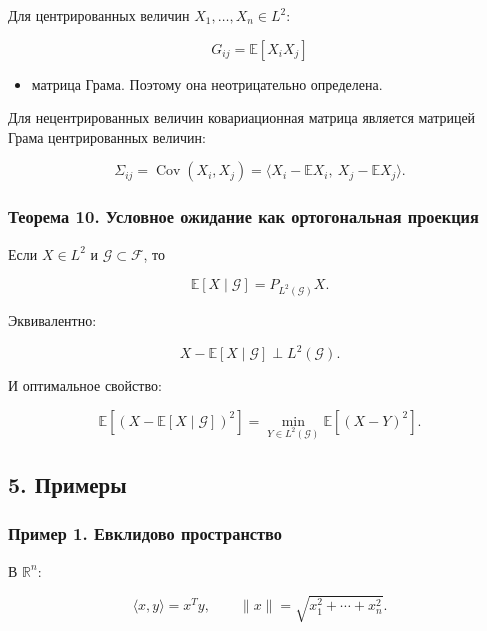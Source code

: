 \documentclass[
  11pt,
  a4paper,
]{article}
\providecommand{\tightlist}{%
  \setlength{\itemsep}{0pt}\setlength{\parskip}{0pt}}
\begin{document}
Для центрированных величин \(X_1,\ldots,X_n\in L^2\):

\[
G_{ij}=\mathbb E[X_iX_j]
\]

\begin{itemize}
\tightlist
\item
  матрица Грама. Поэтому она неотрицательно определена.
\end{itemize}

Для нецентрированных величин ковариационная матрица является матрицей
Грама центрированных величин:

\[
\Sigma_{ij}
=
\operatorname{Cov}(X_i,X_j)
=
\langle X_i-\mathbb EX_i,\ X_j-\mathbb EX_j\rangle.
\]

\subsubsection{Теорема 10. Условное ожидание как ортогональная
проекция}\label{ux442ux435ux43eux440ux435ux43cux430-10.-ux443ux441ux43bux43eux432ux43dux43eux435-ux43eux436ux438ux434ux430ux43dux438ux435-ux43aux430ux43a-ux43eux440ux442ux43eux433ux43eux43dux430ux43bux44cux43dux430ux44f-ux43fux440ux43eux435ux43aux446ux438ux44f}

Если \(X\in L^2\) и \(\mathcal G\subset\mathcal F\), то

\[
\mathbb E[X\mid\mathcal G]
=
P_{L^2(\mathcal G)}X.
\]

Эквивалентно:

\[
X-\mathbb E[X\mid\mathcal G]\perp L^2(\mathcal G).
\]

И оптимальное свойство:

\[
\mathbb E[(X-\mathbb E[X\mid\mathcal G])^2]
=
\min_{Y\in L^2(\mathcal G)}
\mathbb E[(X-Y)^2].
\]

\subsection{5. Примеры}\label{ux43fux440ux438ux43cux435ux440ux44b}

\subsubsection{Пример 1. Евклидово
пространство}\label{ux43fux440ux438ux43cux435ux440-1.-ux435ux432ux43aux43bux438ux434ux43eux432ux43e-ux43fux440ux43eux441ux442ux440ux430ux43dux441ux442ux432ux43e}

В \(\mathbb R^n\):

\[
\langle x,y\rangle=x^Ty,
\qquad
\|x\|=\sqrt{x_1^2+\cdots+x_n^2}.
\]
\end{document}
